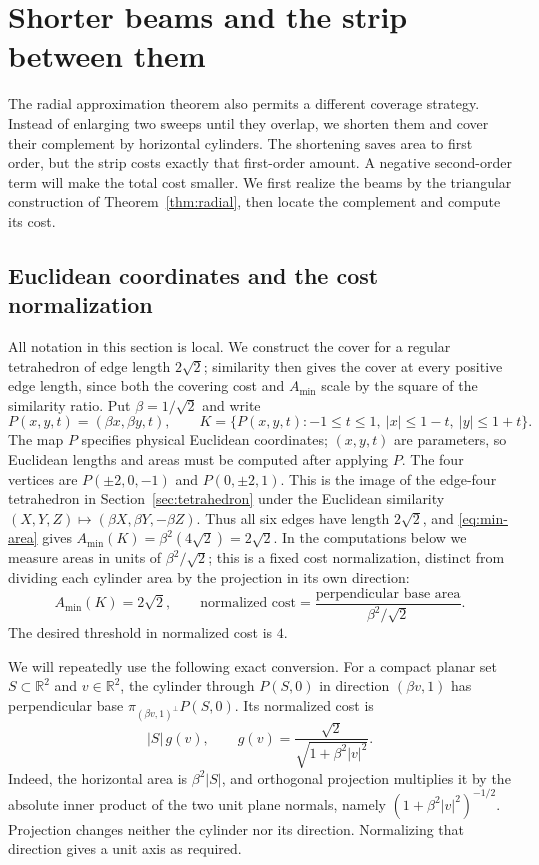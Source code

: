 \section{Shorter beams and the strip between them}
\label{beam:section}

The radial approximation theorem also permits a different coverage
strategy. Instead of enlarging two sweeps until they overlap, we shorten
them and cover their complement by horizontal cylinders. The shortening
saves area to first order, but the strip costs exactly that first-order
amount. A negative second-order term will make the total cost smaller.
We first realize the beams by the triangular construction of
Theorem~\ref{thm:radial}, then locate the complement and compute its cost.

\subsection{Euclidean coordinates and the cost normalization}\label{beam:geometry}

All notation in this section is local. We construct the cover for a
regular tetrahedron of edge length $2\sqrt{2}$; similarity then gives
the cover at every positive edge length, since both the covering cost
and $A_{\min}$ scale by the square of the similarity ratio.
Put $\beta=1/\sqrt{2}$ and write
\[
 P(x,y,t)=(\beta x,\beta y,t),\qquad
 K=\{P(x,y,t):-1\le t\le1,\ |x|\le1-t,\ |y|\le1+t\}.
\]
The map $P$ specifies physical Euclidean coordinates; $(x,y,t)$ are
parameters, so Euclidean lengths and areas must be computed after applying $P$.
The four vertices are $P(\pm2,0,-1)$ and $P(0,\pm2,1)$.
This is the image of the edge-four tetrahedron in
Section~\ref{sec:tetrahedron} under the Euclidean similarity
$(X,Y,Z)\mapsto(\beta X,\beta Y,-\beta Z)$.
Thus all six edges have length $2\sqrt2$, and \eqref{eq:min-area} gives
$A_{\min}(K)=\beta^2(4\sqrt2)=2\sqrt2$.
In the computations below we measure areas in units of
$\beta^2/\sqrt2$; this is a fixed cost normalization, distinct from
dividing each cylinder area by the projection in its own direction:
\begin{equation}\label{beam:normalization}
 A_{\min}(K)=2\sqrt{2},\qquad
 \text{normalized cost}=\frac{\text{perpendicular base area}}{\beta^2/\sqrt{2}}.
\end{equation}
The desired threshold in normalized cost is $4$.

We will repeatedly use the following exact conversion. For a compact planar
set $S\subset\mathbb R^2$ and $v\in\mathbb R^2$, the cylinder through $P(S,0)$ in
direction $(\beta v,1)$ has perpendicular base
$\pi_{(\beta v,1)^\perp}P(S,0)$. Its normalized cost is
\begin{equation}\label{beam:projection-factor}
 |S|\,g(v),\qquad
 g(v)=\frac{\sqrt{2}}{\sqrt{1+\beta^2|v|^2}}.
\end{equation}
Indeed, the horizontal area is $\beta^2|S|$, and orthogonal projection
multiplies it by the absolute inner product of the two unit plane normals,
namely $(1+\beta^2|v|^2)^{-1/2}$. Projection changes neither the cylinder nor
its direction. Normalizing that direction gives a unit axis as required.

